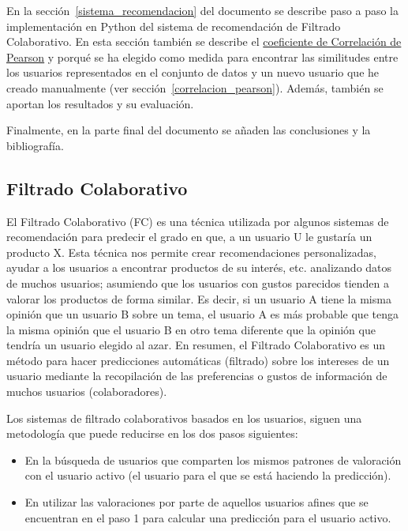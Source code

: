 \documentclass{uimppracticas}
\begin{document}
En la sección~\ref{sistema_recomendacion} del documento se describe paso a paso la implementación en Python del sistema de recomendación de Filtrado Colaborativo. En esta sección también se describe el \href{https://es.wikipedia.org/wiki/Coeficiente_de_correlaci\%C3\%B3n_de_Pearson}{coeficiente de Correlación de Pearson} y porqué se ha elegido como medida para encontrar las similitudes entre los usuarios representados en el conjunto de datos y un nuevo usuario que he creado manualmente (ver sección~\ref{correlacion_pearson}). Además, también se aportan los resultados y su evaluación.

Finalmente, en la parte final del documento se añaden las conclusiones y la bibliografía.

\subsection{Filtrado Colaborativo}\label{filtro_colaborativo}

El Filtrado Colaborativo (FC) es una técnica utilizada por algunos sistemas de recomendación para predecir el grado en que, a un usuario U le gustaría un producto X. Esta técnica nos permite crear recomendaciones personalizadas, ayudar a los usuarios a encontrar productos de su interés, etc. analizando datos de muchos usuarios; asumiendo que los usuarios con gustos parecidos tienden a valorar los productos de forma similar. Es decir, si un usuario A tiene la misma opinión que un usuario B sobre un tema, el usuario A es más probable que tenga la misma opinión que el usuario B en otro tema diferente que la opinión que tendría un usuario elegido al azar. En resumen, el Filtrado Colaborativo es un método para hacer predicciones automáticas (filtrado) sobre los intereses de un usuario mediante la recopilación de las preferencias o gustos de información de muchos usuarios (colaboradores). 

Los sistemas de filtrado colaborativos basados en los usuarios, siguen una metodología que puede reducirse en los dos pasos siguientes:

\begin{itemize}
	\item En la búsqueda de usuarios que comparten los mismos patrones de valoración con el usuario activo (el usuario para el que se está haciendo la predicción).
	\item En utilizar las valoraciones por parte de aquellos usuarios afines que se encuentran en el paso 1 para calcular una predicción para el usuario activo.
\end{itemize}
\end{document}
